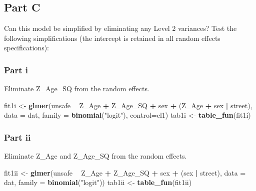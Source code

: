 \documentclass[]{article}
\newenvironment{Shaded}{\begin{snugshade}}{\end{snugshade}}
\newcommand{\KeywordTok}[1]{\textcolor[rgb]{0.13,0.29,0.53}{\textbf{#1}}}
\newcommand{\DataTypeTok}[1]{\textcolor[rgb]{0.13,0.29,0.53}{#1}}
\newcommand{\StringTok}[1]{\textcolor[rgb]{0.31,0.60,0.02}{#1}}
\newcommand{\OperatorTok}[1]{\textcolor[rgb]{0.81,0.36,0.00}{\textbf{#1}}}
\newcommand{\NormalTok}[1]{#1}
\begin{document}
\subsection{Part C}\label{part-c}

Can this model be simplified by eliminating any Level 2 variances? Test
the following simplifications (the intercept is retained in all random
effects specifications):

\subsubsection{Part i}\label{part-i}

Eliminate Z\_Age\_SQ from the random effects.

\begin{Shaded}
\begin{Highlighting}[]
\NormalTok{fit1i <-}\StringTok{ }\KeywordTok{glmer}\NormalTok{(unsafe }\OperatorTok{~}\StringTok{ }\NormalTok{Z_Age }\OperatorTok{+}\StringTok{ }\NormalTok{Z_Age_SQ }\OperatorTok{+}\StringTok{ }\NormalTok{sex }\OperatorTok{+}\StringTok{ }\NormalTok{(Z_Age }\OperatorTok{+}\StringTok{ }\NormalTok{sex }\OperatorTok{|}\StringTok{ }\NormalTok{street), }
               \DataTypeTok{data =}\NormalTok{ dat, }\DataTypeTok{family =} \KeywordTok{binomial}\NormalTok{(}\StringTok{"logit"}\NormalTok{), }\DataTypeTok{control=}\NormalTok{cl1)}
\NormalTok{tab1i <-}\StringTok{ }\KeywordTok{table_fun}\NormalTok{(fit1i)}
\end{Highlighting}
\end{Shaded}

\subsubsection{Part ii}\label{part-ii}

Eliminate Z\_Age and Z\_Age\_SQ from the random effects.

\begin{Shaded}
\begin{Highlighting}[]
\NormalTok{fit1ii <-}\StringTok{ }\KeywordTok{glmer}\NormalTok{(unsafe }\OperatorTok{~}\StringTok{ }\NormalTok{Z_Age }\OperatorTok{+}\StringTok{ }\NormalTok{Z_Age_SQ }\OperatorTok{+}\StringTok{ }\NormalTok{sex }\OperatorTok{+}\StringTok{ }\NormalTok{(sex }\OperatorTok{|}\StringTok{ }\NormalTok{street), }
                \DataTypeTok{data =}\NormalTok{ dat, }\DataTypeTok{family =} \KeywordTok{binomial}\NormalTok{(}\StringTok{"logit"}\NormalTok{))}
\NormalTok{tab1ii <-}\StringTok{ }\KeywordTok{table_fun}\NormalTok{(fit1ii)}
\end{Highlighting}
\end{Shaded}
\end{document}
